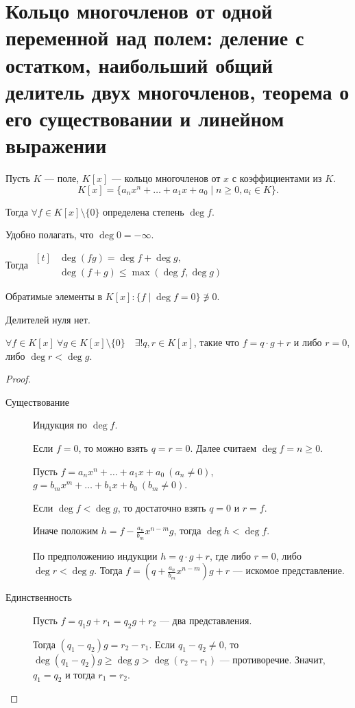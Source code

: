 \section{Кольцо многочленов от одной переменной над полем: деление с остатком, наибольший общий делитель двух многочленов, теорема о его существовании и линейном выражении}

Пусть $K$ --- поле, $K[x]$ --- кольцо многочленов от $x$ с коэффициентами из $K$.
\begin{equation*}
    K[x] = \{a_n x^{n} + \dots + a_1 x + a_0 \mid n \geq 0, a_i \in K\}
.\end{equation*}

Тогда $\forall f \in K[x] \setminus \{0\}$ определена степень $\deg f$.

Удобно полагать, что $\deg 0 = -\infty$.

Тогда
\begin{math}
    \begin{aligned}[t]
        &\deg (fg) = \deg f + \deg g, \\
        &\deg (f + g) \leq \max(\deg f, \deg g)
    \end{aligned}
\end{math}

\medskip
Обратимые элементы в $K[x]: \{f \mid \deg f = 0\} \not\ni 0$.

Делителей нуля нет.

\begin{theorem}
    $\forall f \in K[x] \ \forall g \in K[x] \setminus \{0\} \quad \exists! q, r \in K[x]$, такие что $f = q \cdot g + r$ и либо $r = 0$, либо $\deg r < \deg g$.
\end{theorem}

\begin{proof}~
    \begin{description}
    \item[Существование] 
        Индукция по $\deg f$.

        Если $f = 0$, то можно взять $q = r = 0$. Далее считаем $\deg f = n \geq 0$.

        Пусть $f = a_n x^{n} + \dots + a_1 x + a_0 \ (a_n \neq 0)$, $g = b_m x^{m} + \dots + b_1 x + b_0 \ (b_m \neq 0)$.

        Если $\deg f < \deg g$, то достаточно взять $q = 0$ и $r = f$.

        Иначе положим $h = f - \frac{a_n}{b_m}x^{n - m}g$, тогда $\deg h < \deg f$.

        По предположению индукции $h = q \cdot g + r$, где либо $r = 0$, либо $\deg r < \deg g$. Тогда $f = \left(q + \frac{a_n}{b_m} x^{n - m}\right) g + r$ --- искомое представление.

    \item[Единственность] Пусть $f = q_1 g + r_1 = q_2 g + r_2$ --- два представления.

        Тогда $(q_1 - q_2)g = r_2 - r_1$. Если $q_1 - q_2 \neq 0$, то $\deg (q_1 - q_2)g \geq \deg g > \deg (r_2 - r_1)$ --- противоречие. Значит, $q_1 = q_2$ и тогда $r_1 = r_2$.
        \qedhere
    \end{description}
\end{proof}


